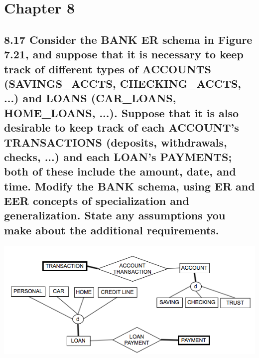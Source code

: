 \section*{Chapter 8}

\subsection*{8.17 Consider the BANK ER schema in Figure 7.21, and suppose that it is necessary to keep track of different types of ACCOUNTS (SAVINGS\_ACCTS, CHECKING\_ACCTS, ...) and LOANS (CAR\_LOANS, HOME\_LOANS, ...). Suppose that it is also desirable to keep track of each ACCOUNT's TRANSACTIONS (deposits, withdrawals, checks, ...) and each LOAN's PAYMENTS; both of these include the amount, date, and time. Modify the BANK schema, using ER and EER concepts of specialization and generalization. State any assumptions you make about the additional requirements.}

\begin{center}
\includegraphics[width=15cm]{images/8-17.png}
\end{center}